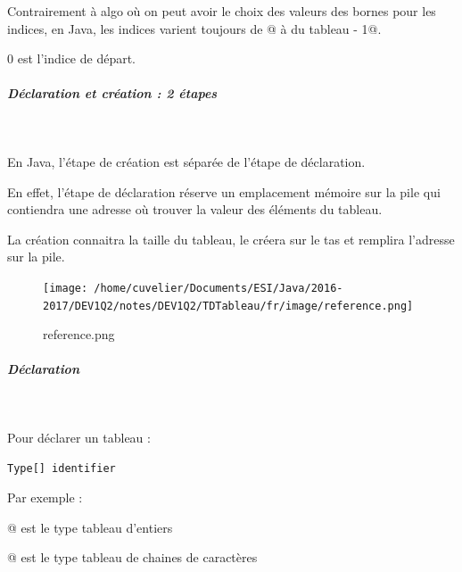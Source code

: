 \documentclass[11pt,a4paper]{article}
\begin{document}
        Contrairement \`a algo o\`u on peut avoir le choix des valeurs des bornes pour les indices, 
        en Java, les indices varient toujours de @ \`a \verb@taille du tableau - 1@.
      
            \par
        0 est l'indice de d\'epart.
            \par
        
			
		\subparagraph{D\'eclaration et cr\'eation : 2 \'etapes} 
		
					\textcolor{white}{.} \par
				
        En Java, l'\'etape de cr\'eation est s\'epar\'ee de l'\'etape de d\'eclaration. \par
				
        En effet, l'\'etape de d\'eclaration r\'eserve un emplacement m\'emoire sur la pile qui contiendra une adresse 
        o\`u trouver la valeur des \'el\'ements du tableau. \par
				
        La cr\'eation connaitra la taille du tableau, le cr\'eera sur le tas et remplira l'adresse sur la pile.
      
            \par
        \begin{figure}[hbt]
				    \begin{center}
					\texttt{[image: /home/cuvelier/Documents/ESI/Java/2016-2017/DEV1Q2/notes/DEV1Q2/TDTableau/fr/image/reference.png]}
						\end{center}
                
                    \caption[reference.png]{reference.png}
                \end{figure}
                    
            \par
        
			
		\subparagraph{D\'eclaration} 
		
					\textcolor{white}{.} \par
				
        Pour d\'eclarer un tableau : 
      
            \par
        \begin{verbatim}
Type[] identifier
      \end{verbatim}
        Par exemple :\par
				\verb@int []@ est le type tableau d'entiers\par
				\verb@String []@ est le type tableau de chaines de caract\`eres
      
\end{document}
